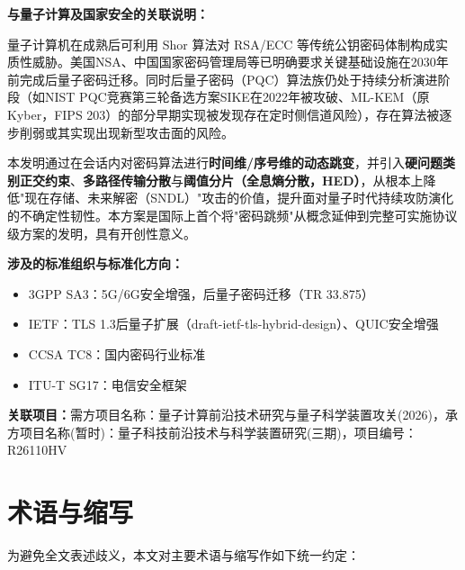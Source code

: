 ﻿\documentclass[12pt,a4paper]{article}
\begin{document}
\textbf{与量子计算及国家安全的关联说明：}

量子计算机在成熟后可利用 Shor 算法对 RSA/ECC 等传统公钥密码体制构成实质性威胁。美国NSA、中国国家密码管理局等已明确要求关键基础设施在2030年前完成后量子密码迁移。同时后量子密码（PQC）算法族仍处于持续分析演进阶段（如NIST PQC竞赛第三轮备选方案SIKE在2022年被攻破、ML-KEM（原Kyber，FIPS 203）的部分早期实现被发现存在定时侧信道风险），存在算法被逐步削弱或其实现出现新型攻击面的风险。

本发明通过在会话内对密码算法进行\textbf{时间维/序号维的动态跳变}，并引入\textbf{硬问题类别正交约束}、\textbf{多路径传输分散}与\textbf{阈值分片（全息熵分散，HED）}，从根本上降低"现在存储、未来解密（SNDL）"攻击的价值，提升面对量子时代持续攻防演化的不确定性韧性。本方案是国际上首个将"密码跳频"从概念延伸到完整可实施协议级方案的发明，具有开创性意义。

\textbf{涉及的标准组织与标准化方向：}
\begin{itemize}[noitemsep]
    \item 3GPP SA3：5G/6G安全增强，后量子密码迁移（TR 33.875）
    \item IETF：TLS 1.3后量子扩展（draft-ietf-tls-hybrid-design）、QUIC安全增强
    \item CCSA TC8：国内密码行业标准
    \item ITU-T SG17：电信安全框架
\end{itemize}

\textbf{关联项目：}需方项目名称：量子计算前沿技术研究与量子科学装置攻关(2026)，承方项目名称(暂时)：量子科技前沿技术与科学装置研究(三期)，项目编号：R26110HV

\section{术语与缩写}

为避免全文表述歧义，本文对主要术语与缩写作如下统一约定：
\end{document}
